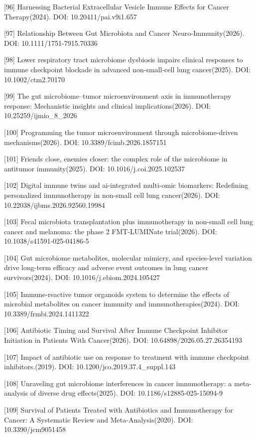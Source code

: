 {[}96{]} Harnessing Bacterial Extracellular Vesicle Immune Effects for Cancer Therapy(2024). DOI: 10.20411/pai.v9i1.657

{[}97{]} Relationship Between Gut Microbiota and Cancer Neuro-Immunity(2026). DOI: 10.1111/1751-7915.70336

{[}98{]} Lower respiratory tract microbiome dysbiosis impairs clinical responses to immune checkpoint blockade in advanced non-small-cell lung cancer(2025). DOI: 10.1002/ctm2.70170

{[}99{]} The gut microbiome--tumor microenvironment axis in immunotherapy response: Mechanistic insights and clinical implications(2026). DOI: 10.25259/ijmio\_8\_2026

{[}100{]} Programming the tumor microenvironment through microbiome-driven mechanisms(2026). DOI: 10.3389/fcimb.2026.1857151

{[}101{]} Friends close, enemies closer: the complex role of the microbiome in antitumor immunity(2025). DOI: 10.1016/j.coi.2025.102537

{[}102{]} Digital immune twins and ai-integrated multi-omic biomarkers: Redefining personalized immunotherapy in non-small cell lung cancer(2026). DOI: 10.22038/ijbms.2026.92560.19984

{[}103{]} Fecal microbiota transplantation plus immunotherapy in non-small cell lung cancer and melanoma: the phase 2 FMT-LUMINate trial(2026). DOI: 10.1038/s41591-025-04186-5

{[}104{]} Gut microbiome metabolites, molecular mimicry, and species-level variation drive long-term efficacy and adverse event outcomes in lung cancer survivors(2024). DOI: 10.1016/j.ebiom.2024.105427

{[}105{]} Immune-reactive tumor organoids system to determine the effects of microbial metabolites on cancer immunity and immunotherapies(2024). DOI: 10.3389/frmbi.2024.1411322

{[}106{]} Antibiotic Timing and Survival After Immune Checkpoint Inhibitor Initiation in Patients With Cancer(2026). DOI: 10.64898/2026.05.27.26354193

{[}107{]} Impact of antibiotic use on response to treatment with immune checkpoint inhibitors.(2019). DOI: 10.1200/jco.2019.37.4\_suppl.143

{[}108{]} Unraveling gut microbiome interferences in cancer immunotherapy: a meta-analysis of diverse drug effects(2025). DOI: 10.1186/s12885-025-15094-9

{[}109{]} Survival of Patients Treated with Antibiotics and Immunotherapy for Cancer: A Systematic Review and Meta-Analysis(2020). DOI: 10.3390/jcm9051458

